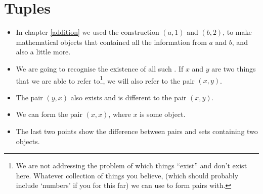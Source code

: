 \chapter{Tuples}
\label{tuples}

\begin{itemize}
\item
In chapter \ref{addition} we used the construction $(a, 1)$ and $(b, 2)$, to make mathematical objects that contained all the information from $a$ and $b$, and also a little more.
\item
We are going to recognise the existence of all such . If $x$ and $y$ are two things that we are able to refer to\footnote{We are not addressing the problem of which things ``exist'' and don't exist here. Whatever collection of things you believe, (which should probably include `numbers' if you for this far) we can use to form pairs with.}, we will also refer to the pair $(x, y)$.
\item
The pair $(y,x)$ also exists and is different to the pair $(x,y)$.
\item
We can form the pair $(x,x)$, where $x$ is some object.
\item
The last two points show the difference between pairs and sets containing two objects. 

\end{itemize}

